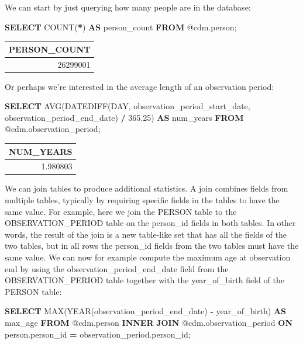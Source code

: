 \documentclass[11pt]{book}
\newenvironment{Shaded}{\begin{snugshade}}{\end{snugshade}}
\newcommand{\DataTypeTok}[1]{\textcolor[rgb]{0.13,0.29,0.53}{#1}}
\newcommand{\FloatTok}[1]{\textcolor[rgb]{0.00,0.00,0.81}{#1}}
\newcommand{\FunctionTok}[1]{\textcolor[rgb]{0.00,0.00,0.00}{#1}}
\newcommand{\KeywordTok}[1]{\textcolor[rgb]{0.13,0.29,0.53}{\textbf{#1}}}
\newcommand{\NormalTok}[1]{#1}
\newcommand{\OperatorTok}[1]{\textcolor[rgb]{0.81,0.36,0.00}{\textbf{#1}}}
\theoremstyle{definition}
\theoremstyle{definition}
\theoremstyle{definition}
\theoremstyle{remark}
\begin{document}
We can start by just querying how many people are in the database:

\begin{Shaded}
\begin{Highlighting}[]
\KeywordTok{SELECT} \FunctionTok{COUNT}\NormalTok{(}\OperatorTok{*}\NormalTok{) }\KeywordTok{AS}\NormalTok{ person_count }\KeywordTok{FROM}\NormalTok{ @cdm.person;}
\end{Highlighting}
\end{Shaded}

\begin{longtable}[]{@{}r@{}}
\toprule
PERSON\_COUNT\tabularnewline
\midrule
\endhead
26299001\tabularnewline
\bottomrule
\end{longtable}

Or perhaps we're interested in the average length of an observation period:

\begin{Shaded}
\begin{Highlighting}[]
\KeywordTok{SELECT} \FunctionTok{AVG}\NormalTok{(DATEDIFF(}\DataTypeTok{DAY}\NormalTok{, }
\NormalTok{                    observation_period_start_date, }
\NormalTok{                    observation_period_end_date) }\OperatorTok{/} \FloatTok{365.25}\NormalTok{) }\KeywordTok{AS}\NormalTok{ num_years}
\KeywordTok{FROM}\NormalTok{ @cdm.observation_period;}
\end{Highlighting}
\end{Shaded}

\begin{longtable}[]{@{}r@{}}
\toprule
NUM\_YEARS\tabularnewline
\midrule
\endhead
1.980803\tabularnewline
\bottomrule
\end{longtable}

We can join tables to produce additional statistics. A join combines fields from multiple tables, typically by requiring specific fields in the tables to have the same value. For example, here we join the PERSON table to the OBSERVATION\_PERIOD table on the person\_id fields in both tables. In other words, the result of the join is a new table-like set that has all the fields of the two tables, but in all rows the person\_id fields from the two tables must have the same value. We can now for example compute the maximum age at observation end by using the observation\_period\_end\_date field from the OBSERVATION\_PERIOD table together with the year\_of\_birth field of the PERSON table:

\begin{Shaded}
\begin{Highlighting}[]
\KeywordTok{SELECT} \FunctionTok{MAX}\NormalTok{(}\DataTypeTok{YEAR}\NormalTok{(observation_period_end_date) }\OperatorTok{-}
\NormalTok{           year_of_birth) }\KeywordTok{AS}\NormalTok{ max_age}
\KeywordTok{FROM}\NormalTok{ @cdm.person}
\KeywordTok{INNER} \KeywordTok{JOIN}\NormalTok{ @cdm.observation_period}
  \KeywordTok{ON}\NormalTok{ person.person_id }\OperatorTok{=}\NormalTok{ observation_period.person_id;}
\end{Highlighting}
\end{Shaded}
\end{document}
